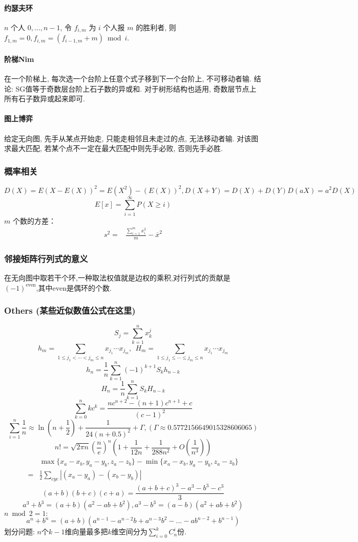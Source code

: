 \begin{small}
\begin{multicols}{2}
\paragraph{约瑟夫环}$n$ 个人 $0,\dots,n-1$, 令 $f_{i,m}$ 为 $i$ 个人报 $m$ 的胜利者, 则 $f_{1,m}=0,f_{i,m}=(f_{i-1,m}+m)\bmod i$. 
\paragraph{阶梯Nim} 在一个阶梯上, 每次选一个台阶上任意个式子移到下一个台阶上, 不可移动者输. 结论: SG值等于奇数层台阶上石子数的异或和. 对于树形结构也适用, 奇数层节点上所有石子数异或起来即可.
\paragraph{图上博弈} 给定无向图, 先手从某点开始走, 只能走相邻且未走过的点, 无法移动者输. 对该图求最大匹配, 若某个点不一定在最大匹配中则先手必败, 否则先手必胜.
\end{multicols}


\subsubsection{概率相关}
$D(X)=E(X-E(X))^2=E(X^2)-(E(X))^2,D(X+Y)=D(X)+D(Y)D(aX)=a^2D(X)$
\[E[x]=\sum_{i=1}^{\infty}P(X\geq i)\]
$m$ 个数的方差：
$$\begin{aligned}s^2=&\frac{\sum_{i=1}^m x_i^2}m-\overline x^2\end{aligned}$$

\subsubsection{邻接矩阵行列式的意义}
在无向图中取若干个环,一种取法权值就是边权的乘积,对行列式的贡献是$(-1)^{\mathrm{even}}$,其中$\mathrm{even}$是偶环的个数.

\subsubsection{Others (某些近似数值公式在这里)}
\[ S_j = \sum_{k=1}^nx_k^j \]
\[ h_m = \sum_{1\leq j_1 < \cdots < j_m \leq n} x_{j_1}\cdots x_{j_m},\ \ H_m = \sum_{1\leq j_1 \leq \cdots \leq j_m \leq n} x_{j_1}\cdots x_{j_m} \]
\[ h_n = \frac{1}{n}\sum_{k=1}^n(-1)^{k+1}S_kh_{n-k} \]
\[ H_n = \frac{1}{n}\sum_{k=1}^nS_kH_{n-k} \]
\[ \sum_{k=0}^nkc^k = \frac{nc^{n+2}-(n+1)c^{n+1}+c}{(c-1)^2} \]
\[ \sum_{i=1}^n\frac 1n\approx\ln\left(n + \frac 1 2\right) + \frac{1}{24(n+0.5)^2}+\Gamma,(\Gamma\approx0.5772156649015328606065)\]
\[ n! = \sqrt{2\pi n}(\frac{n}{e})^n(1+\frac{1}{12n}+\frac{1}{288n^2}+O(\frac{1}{n^3})) \]
\[ \begin{aligned}
 &\max{\{x_a-x_b, y_a-y_b, z_a-z_b\}} - \min{\{x_a-x_b, y_a-y_b, z_a-z_b\}} \\
=& \frac{1}{2}\sum_{cyc}\left| (x_a-y_a)-(x_b-y_b) \right|
\end{aligned} \]
\[ (a+b)(b+c)(c+a) = \frac{(a+b+c)^3 - a^3 - b^3 - c^3}{3} \]
\[ a^3+b^3=(a+b)(a^2-ab+b^2),a^3-b^3=(a-b)(a^2+ab+b^2) \]
$n\bmod 2=1:$
\[ a^n+b^n=(a+b)(a^{n-1}-a^{n-2}b+a^{n-3}b^2-...-ab^{n-2}+b^{n-1})\]
划分问题: $n$个$k-1$维向量最多把$k$维空间分为$\sum_{i=0}^{k}C_n^i$份.
\end{small}
